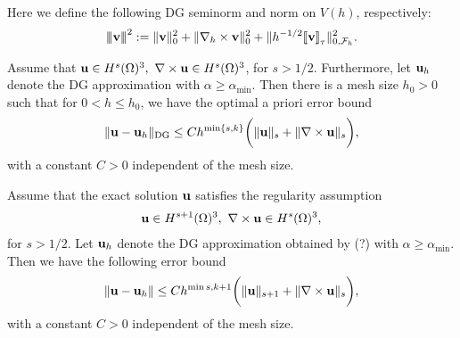\documentclass[final,leqno]{siamltex704}
\newcommand{\bv}{{\bf v}}
\def\bu{{\bf u}}
\def\bv{{\bf v}}
\def\ljump{{[\![}}
\def\rjump{{]\!]}}
\def\3bar{{|\hspace{-.02in}|\hspace{-.02in}|}}
\begin{document}
Here we define the following DG seminorm and norm on $V(h)$, respectively:
\begin{eqnarray}
\3bar\bv\3bar^2:=\|\bv\|_0^2+\|\nabla_h\times\bv\|_0^2+\|h^{-1/2}\ljump\bv\rjump_{\tau}\|_{0,\mathcal{F}_h}^2.
\end{eqnarray}

\begin{theorem}
Assume that $\bu\in H^s(\Omega)^3,\ \nabla\times\bu\in H^s(\Omega)^3$, for $s>1/2$. Furthermore, let $\bu_h$ denote the DG approximation with $\alpha\ge \alpha_{\min}.$ Then there is a mesh size $h_0>0$ such that for $0<h\le h_0$, we have the optimal a priori error bound
\begin{eqnarray}
\|\bu-\bu_h\|_{\text{DG}}\le Ch^{\min\{s,k\}}\bigg(\|\bu\|_s+\|\nabla\times\bu\|_s\bigg),
\end{eqnarray}
with a constant $C>0$ independent of the mesh size.
\end{theorem}

\begin{theorem}
Assume that the exact solution $\bu$ satisfies the regularity assumption
\begin{eqnarray}
\bu\in H^{s+1}(\Omega)^3,\ \nabla\times\bu\in H^s(\Omega)^3,
\end{eqnarray}
for $s>1/2$. Let $\bu_h$ denote the DG approximation obtained by (?) with $\alpha\ge\alpha_{\min}$. Then we have the following error bound
\begin{eqnarray}
\|\bu-\bu_h\|\le Ch^{\min{s,k}+1}\bigg(\|\bu\|_{s+1}+\|\nabla\times\bu\|_s\bigg),
\end{eqnarray}
with a constant $C>0$ independent of the mesh size.
\end{theorem}
\end{document}
